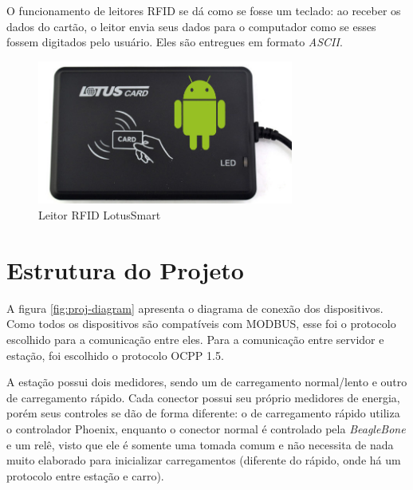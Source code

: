 O funcionamento de leitores \ac{RFID} se dá como se fosse um teclado: ao receber os dados do cartão, o leitor envia seus dados para o computador como se esses fossem digitados pelo usuário. Eles são entregues em formato \textit{ASCII}.

\begin{figure}[H]
        \begin{center}
                \includegraphics[width=0.75\textwidth,natwidth=655,natheight=368]{assets/images/devices-rfid.jpg}
                \caption{Leitor RFID LotusSmart}
                \label{fig:ihm}
        \end{center}
\end{figure}

\section{Estrutura do Projeto}

A figura \ref{fig:proj-diagram} apresenta o diagrama de conexão dos dispositivos. Como todos os dispositivos são compatíveis com MODBUS, esse foi o protocolo escolhido para a comunicação entre eles. Para a comunicação entre servidor e estação, foi escolhido o protocolo \ac{OCPP} 1.5.

A estação possui dois medidores, sendo um de carregamento normal/lento e outro de carregamento rápido. Cada conector possui seu próprio medidores de energia, porém seus controles se dão de forma diferente: o de carregamento rápido utiliza o controlador Phoenix, enquanto o conector normal é controlado pela \textit{BeagleBone} e um relê, visto que ele é somente uma tomada comum e não necessita de nada muito elaborado para inicializar carregamentos (diferente do rápido, onde há um protocolo entre estação e carro).

